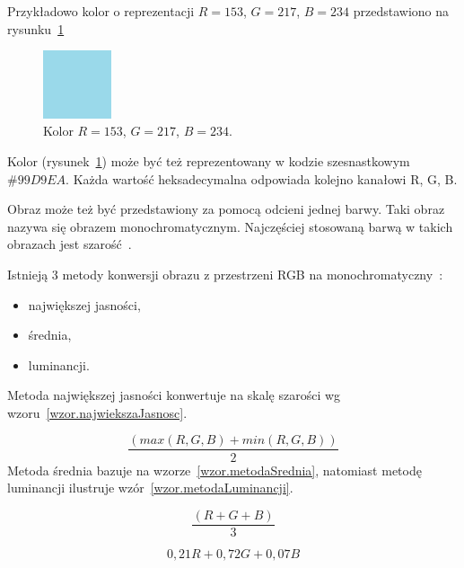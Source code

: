 \documentclass[a4paper,twoside,12pt]{book}
\begin{document}
    Przykładowo kolor o reprezentacji $R=153$, $G=217$, $B=234$ przedstawiono na rysunku~\ref{fig.mieszanieKolorowBlekitny}

    \begin{figure}
        \centering
        \includegraphics[width=2cm]{Obrazy/blekitny.jpg}
        \caption{Kolor $R=153$, $G=217$, $B=234$.}
        \label{fig.mieszanieKolorowBlekitny}
    \end{figure}

    Kolor (rysunek~\ref{fig.mieszanieKolorowBlekitny}) może być też reprezentowany w kodzie szesnastkowym $\#99D9EA$.
    Każda
    wartość heksadecymalna odpowiada kolejno kanałowi R, G, B.

    Obraz może też być przedstawiony za pomocą odcieni jednej barwy.
    Taki obraz nazywa się obrazem monochromatycznym.
    Najczęściej stosowaną barwą w takich obrazach jest szarość~\cite{przestrzenieKolorow}.

    Istnieją 3 metody konwersji obrazu z przestrzeni RGB na monochromatyczny~\cite{colorMixing}:
    \begin{itemize}
        \item największej jasności,
        \item średnia,
        \item luminancji.
    \end{itemize}
    Metoda największej jasności konwertuje na skalę szarości wg wzoru~\ref{wzor.najwiekszaJasnosc}.

    \begin{equation}
        \frac{(max(R, G, B) + min(R, G, B))}{2}
        \label{wzor.najwiekszaJasnosc}
    \end{equation}
    \normalsize
    Metoda średnia bazuje na wzorze~\ref{wzor.metodaSrednia}, natomiast metodę luminancji ilustruje wzór~\ref{wzor.metodaLuminancji}.

    \begin{equation}
        \frac{(R + G + B)}{3}
        \label{wzor.metodaSrednia}
    \end{equation}
    \normalsize

    \begin{equation}
        0,21 R + 0,72 G + 0,07 B
        \label{wzor.metodaLuminancji}
    \end{equation}
    \normalsize
\end{document}
